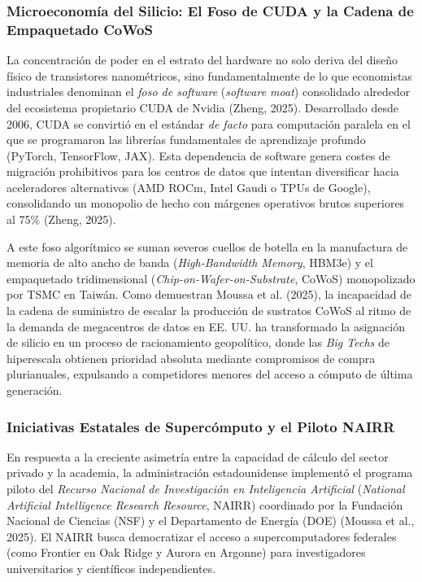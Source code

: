 \subsubsection{Microeconomía del Silicio: El Foso de CUDA y la Cadena de Empaquetado CoWoS}

La concentración de poder en el estrato del hardware no solo deriva del diseño físico de transistores nanométricos, sino fundamentalmente de lo que economistas industriales denominan el \textit{foso de software} (\textit{software moat}) consolidado alrededor del ecosistema propietario CUDA de Nvidia (Zheng, 2025). Desarrollado desde 2006, CUDA se convirtió en el estándar \textit{de facto} para computación paralela en el que se programaron las librerías fundamentales de aprendizaje profundo (PyTorch, TensorFlow, JAX). Esta dependencia de software genera costes de migración prohibitivos para los centros de datos que intentan diversificar hacia aceleradores alternativos (AMD ROCm, Intel Gaudi o TPUs de Google), consolidando un monopolio de hecho con márgenes operativos brutos superiores al 75\% (Zheng, 2025).

A este foso algorítmico se suman severos cuellos de botella en la manufactura de memoria de alto ancho de banda (\textit{High-Bandwidth Memory}, HBM3e) y el empaquetado tridimensional (\textit{Chip-on-Wafer-on-Substrate}, CoWoS) monopolizado por TSMC en Taiwán. Como demuestran Moussa et al. (2025), la incapacidad de la cadena de suministro de escalar la producción de sustratos CoWoS al ritmo de la demanda de megacentros de datos en EE. UU. ha transformado la asignación de silicio en un proceso de racionamiento geopolítico, donde las \textit{Big Techs} de hiperescala obtienen prioridad absoluta mediante compromisos de compra plurianuales, expulsando a competidores menores del acceso a cómputo de última generación.

\subsubsection{Iniciativas Estatales de Supercómputo y el Piloto NAIRR}

En respuesta a la creciente asimetría entre la capacidad de cálculo del sector privado y la academia, la administración estadounidense implementó el programa piloto del \textit{Recurso Nacional de Investigación en Inteligencia Artificial} (\textit{National Artificial Intelligence Research Resource}, NAIRR) coordinado por la Fundación Nacional de Ciencias (NSF) y el Departamento de Energía (DOE) (Moussa et al., 2025). El NAIRR busca democratizar el acceso a supercomputadores federales (como Frontier en Oak Ridge y Aurora en Argonne) para investigadores universitarios y científicos independientes.

